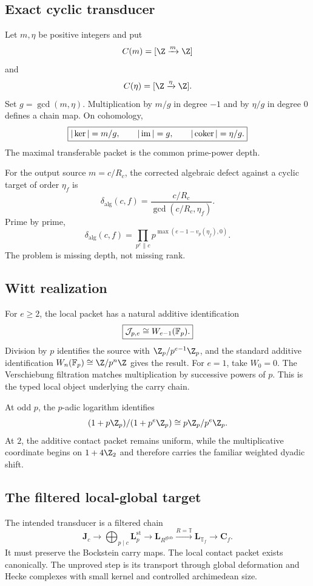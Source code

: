 \subsection{Exact cyclic transducer}
Let $m,\eta$ be positive integers and put
\[
 C(m)=[\Z\xrightarrow{m}\Z]
\]
and
\[
 C(\eta)=[\Z\xrightarrow{\eta}\Z].
\]
Set $g=\gcd(m,\eta)$. Multiplication by $m/g$ in degree $-1$ and by $\eta/g$ in degree $0$ defines a chain map. On cohomology,
\[
 \boxed{
 |\ker|=m/g,
 \qquad
 |\operatorname{im}|=g,
 \qquad
 |\operatorname{coker}|=\eta/g.
 }
\]
The maximal transferable packet is the common prime-power depth.

For the output source $m=c/R_c$, the corrected algebraic defect against a cyclic target of order $\eta_f$ is
\[
 \boxed{
 \delta_{\mathrm{alg}}(c,f)
 =
 \frac{c/R_c}{\gcd(c/R_c,\eta_f)}.
 }
\]
Prime by prime,
\[
 \delta_{\mathrm{alg}}(c,f)
 =
 \prod_{p^e\parallel c}
 p^{\max(e-1-v_p(\eta_f),0)}.
\]
The problem is missing depth, not missing rank.

\subsection{Witt realization}
For $e\ge2$, the local packet has a natural additive identification
\[
 \boxed{
 \mathcal J_{p,e}
 \cong
 W_{e-1}(\mathbb F_p).
 }
\]
Division by $p$ identifies the source with $\Z_p/p^{e-1}\Z_p$, and the standard additive identification $W_n(\F_p)\cong\Z/p^n\Z$ gives the result. For $e=1$, take $W_0=0$. The Verschiebung filtration matches multiplication by successive powers of $p$. This is the typed local object underlying the carry chain.

At odd $p$, the $p$-adic logarithm identifies
\[
 (1+p\Z_p)/(1+p^e\Z_p)
 \cong
 p\Z_p/p^e\Z_p.
\]
At $2$, the additive contact packet remains uniform, while the multiplicative coordinate begins on $1+4\Z_2$ and therefore carries the familiar weighted dyadic shift.

\subsection{The filtered local-global target}
The intended transducer is a filtered chain
\[
 \mathbf J_c
 \longrightarrow
 \bigoplus_{p\mid c}\mathbf L_p^{\mathrm{st}}
 \longrightarrow
 \mathbf L_{R^{\mathrm{glob}}}
 \xrightarrow{R=\mathbb T}
 \mathbf L_{\mathbb T_f}
 \longrightarrow
 \mathbf C_f.
\]
It must preserve the Bockstein carry maps. The local contact packet exists canonically. The unproved step is its transport through global deformation and Hecke complexes with small kernel and controlled archimedean size.

